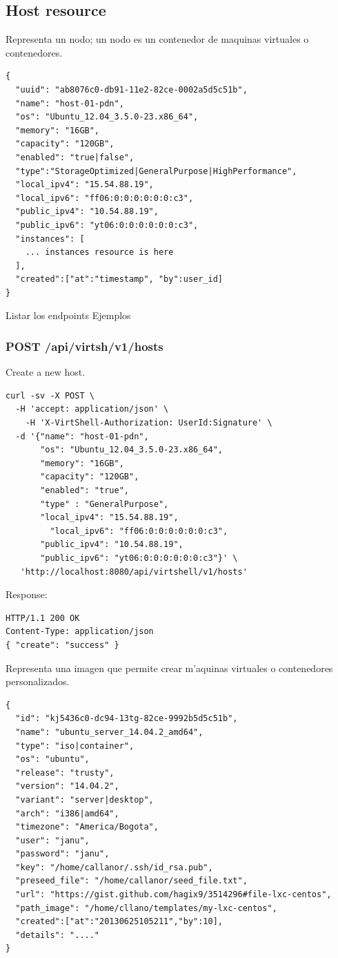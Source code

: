 \subsection{Host resource}
Representa un nodo; un nodo es un contenedor de maquinas virtuales o contenedores.

\medskip
\begin{lstlisting}[tabsize=8,basicstyle=\ttfamily]
{
  "uuid": "ab8076c0-db91-11e2-82ce-0002a5d5c51b",
  "name": "host-01-pdn",
  "os": "Ubuntu_12.04_3.5.0-23.x86_64",
  "memory": "16GB",
  "capacity": "120GB",
  "enabled": "true|false",
  "type":"StorageOptimized|GeneralPurpose|HighPerformance",
  "local_ipv4": "15.54.88.19",
  "local_ipv6": "ff06:0:0:0:0:0:0:c3",
  "public_ipv4": "10.54.88.19",
  "public_ipv6": "yt06:0:0:0:0:0:0:c3",
  "instances": [
    ... instances resource is here
  ],
  "created":["at":"timestamp", "by":user_id]
}
\end{lstlisting}

Listar los endpoints
Ejemplos

\subsubsection{POST /api/virtsh/v1/hosts}

Create a new host.

\begin{lstlisting}[tabsize=8,basicstyle=\ttfamily]
curl -sv -X POST \
  -H 'accept: application/json' \
    -H 'X-VirtShell-Authorization: UserId:Signature' \
  -d '{"name": "host-01-pdn",
       "os": "Ubuntu_12.04_3.5.0-23.x86_64",
       "memory": "16GB",
       "capacity": "120GB",
       "enabled": "true",
       "type" : "GeneralPurpose",
       "local_ipv4": "15.54.88.19",
         "local_ipv6": "ff06:0:0:0:0:0:0:c3",
       "public_ipv4": "10.54.88.19",
       "public_ipv6": "yt06:0:0:0:0:0:0:c3"}' \
   'http://localhost:8080/api/virtshell/v1/hosts'
\end{lstlisting}

Response:

\begin{lstlisting}[tabsize=8,basicstyle=\ttfamily]
HTTP/1.1 200 OK
Content-Type: application/json
{ "create": "success" }
\end{lstlisting}

\item [Image resource] Representa una imagen que permite crear m'aquinas virtuales o contenedores personalizados. 

\medskip
\begin{lstlisting}
{
  "id": "kj5436c0-dc94-13tg-82ce-9992b5d5c51b",
  "name": "ubuntu_server_14.04.2_amd64",
  "type": "iso|container",
  "os": "ubuntu", 
  "release": "trusty",
  "version": "14.04.2", 
  "variant": "server|desktop", 
  "arch": "i386|amd64", 
  "timezone": "America/Bogota", 
  "user": "janu", 
  "password": "janu", 
  "key": "/home/callanor/.ssh/id_rsa.pub",
  "preseed_file": "/home/callanor/seed_file.txt",
  "url": "https://gist.github.com/hagix9/3514296#file-lxc-centos",
  "path_image": "/home/cllano/templates/my-lxc-centos",  
  "created":["at":"20130625105211","by":10],
  "details": "...."
}
\end{lstlisting}

